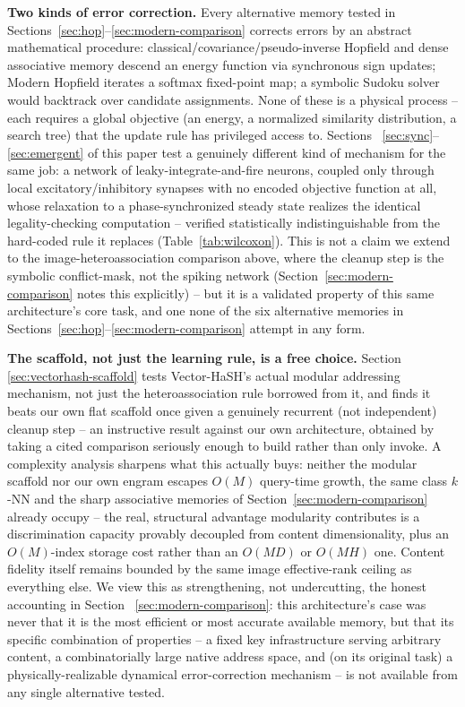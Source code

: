 \documentclass[11pt]{article}
\begin{document}
\textbf{Two kinds of error correction.} Every alternative memory tested in
Sections~\ref{sec:hop}--\ref{sec:modern-comparison} corrects errors by an abstract mathematical
procedure: classical/covariance/pseudo-inverse Hopfield and dense associative memory descend an
energy function via synchronous sign updates; Modern Hopfield iterates a softmax fixed-point
map; a symbolic Sudoku solver would backtrack over candidate assignments. None of these is a
physical process -- each requires a global objective (an energy, a normalized similarity
distribution, a search tree) that the update rule has privileged access to. Sections~
\ref{sec:sync}--\ref{sec:emergent} of this paper test a genuinely different kind of mechanism
for the same job: a network of leaky-integrate-and-fire neurons, coupled only through local
excitatory/inhibitory synapses with no encoded objective function at all, whose relaxation to a
phase-synchronized steady state realizes the identical legality-checking computation --
verified statistically indistinguishable from the hard-coded rule it replaces
(Table~\ref{tab:wilcoxon}). This is not a claim we extend to the image-heteroassociation
comparison above, where the cleanup step is the symbolic conflict-mask, not the spiking network
(Section~\ref{sec:modern-comparison} notes this explicitly) -- but it is a validated property of
this same architecture's core task, and one none of the six alternative memories in
Sections~\ref{sec:hop}--\ref{sec:modern-comparison} attempt in any form.

\textbf{The scaffold, not just the learning rule, is a free choice.} Section~
\ref{sec:vectorhash-scaffold} tests Vector-HaSH's actual modular addressing mechanism, not just
the heteroassociation rule borrowed from it, and finds it beats our own flat scaffold once given
a genuinely recurrent (not independent) cleanup step -- an instructive result against our own
architecture, obtained by taking a cited comparison seriously enough to build rather than only
invoke. A complexity analysis sharpens what this actually buys: neither the modular scaffold nor
our own engram escapes $O(M)$ query-time growth, the same class $k$-NN and the sharp associative
memories of Section~\ref{sec:modern-comparison} already occupy -- the real, structural advantage
modularity contributes is a discrimination capacity provably decoupled from content
dimensionality, plus an $O(M)$-index storage cost rather than an $O(MD)$ or $O(MH)$ one. Content
fidelity itself remains bounded by the same image effective-rank ceiling as everything else.
We view this as strengthening, not undercutting, the honest accounting in Section~
\ref{sec:modern-comparison}: this architecture's case was never that it is the most efficient or
most accurate available memory, but that its specific combination of properties -- a fixed key
infrastructure serving arbitrary content, a combinatorially large native address space, and (on
its original task) a physically-realizable dynamical error-correction mechanism -- is not
available from any single alternative tested.
\end{document}
